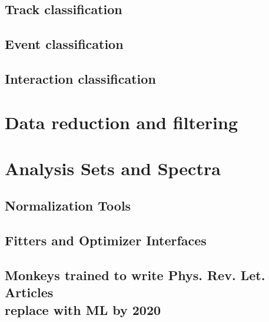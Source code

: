\subsection{Track classification}
\subsection{Event classification}
\subsection{Interaction classification}
\section{Data reduction and filtering}
\section{Analysis Sets and Spectra}
\subsection{Normalization Tools}
\subsection{Fitters and Optimizer Interfaces}
\subsection{Monkeys trained to write Phys. Rev. Let. Articles\\ replace with ML by 2020}
